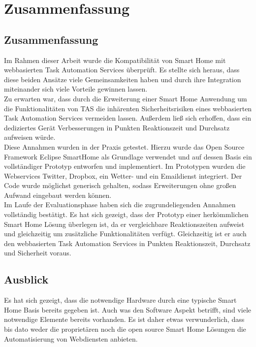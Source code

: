 \chapter{Zusammenfassung}
\label{chap:ausblick}

\section{Zusammenfassung}
Im Rahmen dieser Arbeit wurde die Kompatibilität von Smart Home mit webbasierten Task Automation Services überprüft. Es stellte sich heraus, dass diese beiden Ansätze viele Gemeinsamkeiten haben und durch ihre Integration miteinander sich viele Vorteile gewinnen lassen.\\

Zu erwarten war, dass durch die Erweiterung einer Smart Home Anwendung um die Funktionalitäten von TAS die inhärenten Sicherheitsrisiken eines webbasierten Task Automation Services vermeiden lassen. Außerdem ließ sich erhoffen, dass ein dediziertes Gerät Verbesserungen in Punkten Reaktionszeit und Durchsatz aufweisen würde.\\

Diese Annahmen wurden in der Praxis getestet. Hierzu wurde das Open Source Framework Eclipse SmartHome als Grundlage verwendet und auf dessen Basis ein vollständiger Prototyp entworfen und implementiert. Im Prototypen wurden die Webservices Twitter, Dropbox, ein Wetter- und ein Emaildienst integriert. Der Code wurde möglichst generisch gehalten, sodass Erweiterungen ohne großen Aufwand eingebaut werden können.\\

Im Laufe der Evaluationsphase haben sich die zugrundeliegenden Annahmen vollständig bestätigt. Es hat sich gezeigt, dass der Prototyp einer herkömmlichen Smart Home Lösung überlegen ist, da er vergleichbare Reaktionszeiten aufweist und gleichzeitig um zusätzliche Funktionalitäten verfügt. Gleichzeitig ist er auch den webbasierten Task Automation Services  in Punkten Reaktionszeit, Durchsatz und Sicherheit voraus.






\section{Ausblick}
Es hat sich gezeigt, dass die notwendige Hardware durch eine typische Smart Home Basis bereits gegeben ist. Auch was den Software Aspekt betrifft, sind viele notwendige Elemente bereits vorhanden. Es ist daher etwas verwunderlich, dass bis dato weder die proprietären noch die open source Smart Home Lösungen die Automatisierung von Webdiensten anbieten. 

